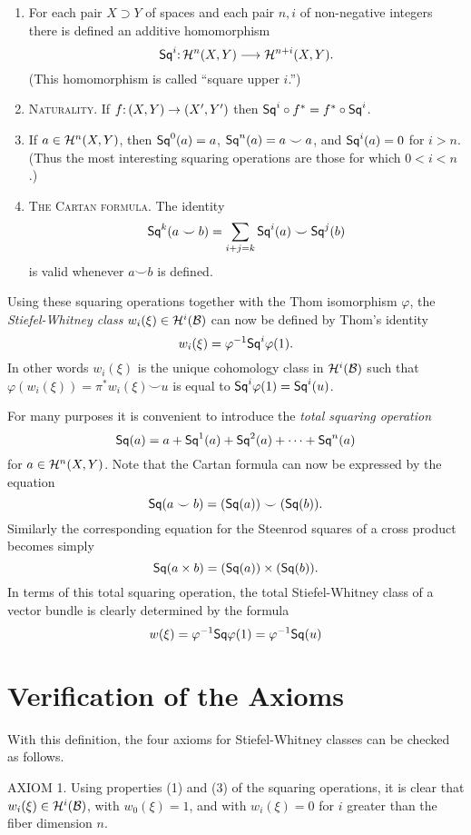 \begin{enumerate}[label=(\arabic*),leftmargin=2\parindent ]
	\item For each pair $X \supset Y$ of spaces and each pair $ n , i$ of non-negative integers there is defined an additive homomorphism
	\[
	\map{\sq^{i}}{\homology^{ n }(X, Y)}{\homology^{ n +i}(X, Y)}.
	\]
	(This homomorphism is called ``square upper $i$.'')
	\item \textsc{Naturality.} If $\map{f}{(X,Y)}{(X',Y')}$ then $\mathsf{Sq}^{i} \circ f^{*}=f^{*} \circ \mathsf{Sq}^{i}$.
	\item If $a \in \mathcal{H}^{ n }(X, Y)$, then $\mathsf{Sq}^{0}(a)=a$, $\mathsf{Sq}^{ n }(a)=a \smile a$, and $\mathsf{Sq}^{i}(a)=0$ for $i> n $. (Thus the most interesting squaring operations are those for which $0<i< n $.)
	\item \textsc{The Cartan formula.} The identity
	\[
	\mathsf{Sq}^{k}(a \smile b)=\sum_{i+j=k} \mathsf{Sq}^{i}(a) \smile \mathsf{Sq}^{j}(b)
	\]
	is valid whenever $a \smile b$ is defined.
\end{enumerate}
 Using these squaring operations together with the Thom isomorphism $\varphi$, the \textit{Stiefel-Whitney class} $w_{i}(\xi) \in \mathcal{H}^{i}(\mathcal{B} )$ can now be defined by Thom's identity
\[
w_{i}(\xi)=\varphi^{-1} \mathsf{Sq}^{i} \varphi(1).
\]
In other words $w_{i}(\xi)$ is the unique cohomology class in $\mathcal{H}^{i}(\mathcal{B} )$ such that $\varphi(w_{i}(\xi))=\pi^{*} w_{i}(\xi) \smile u$ is equal to $\mathsf{Sq}^{i} \varphi(1)=\mathsf{Sq}^{i}(u)$.

For many purposes it is convenient to introduce the \textit{total squaring operation}
\[
\mathsf{Sq}(a)=a+\mathsf{Sq}^{1}(a)+\mathsf{Sq}^{2}(a)+\dots+\mathsf{Sq}^{ n }(a)
\]
for $a \in \mathcal{H}^{ n }(X, Y)$. Note that the Cartan formula can now be expressed by the equation
\[
\mathsf{Sq}(a \smile b)=(\mathsf{Sq}( a)) \smile(\mathsf{Sq}( b)).
\]
Similarly the corresponding equation for the Steenrod squares of a cross product becomes simply
\[
\mathsf{Sq}(a \times b)=(\mathsf{Sq} (a)) \times(\mathsf{Sq} (b)).
\]
In terms of this total squaring operation, the total Stiefel-Whitney class of a vector bundle is clearly determined by the formula
\[
w(\xi)=\varphi^{-1} \mathsf{Sq} \varphi(1)=\varphi^{-1} \mathsf{Sq}(u)
\]

\section*{Verification of the Axioms}
With this definition, the four axioms for Stiefel-Whitney classes can be checked as follows.\vspace{.3cm}

\noindent\textsf{AXIOM 1.} Using properties (1) and (3) of the squaring operations, it is clear that $w_{i}(\xi) \in \mathcal{H}^{i}(\mathcal{B} )$, with $w_{0}(\xi)=1$, and with $w_{i}(\xi)=0$ for $i$ greater than the fiber dimension $ n $.\vspace{.3cm}

